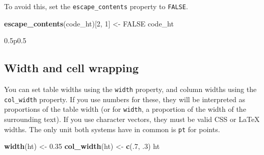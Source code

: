 \documentclass[]{article}
\newenvironment{Shaded}{\begin{snugshade}}{\end{snugshade}}
\newcommand{\DecValTok}[1]{\textcolor[rgb]{0.00,0.00,0.81}{#1}}
\newcommand{\FloatTok}[1]{\textcolor[rgb]{0.00,0.00,0.81}{#1}}
\newcommand{\KeywordTok}[1]{\textcolor[rgb]{0.13,0.29,0.53}{\textbf{#1}}}
\newcommand{\NormalTok}[1]{#1}
\newcommand{\OtherTok}[1]{\textcolor[rgb]{0.56,0.35,0.01}{#1}}
\newcommand{\StringTok}[1]{\textcolor[rgb]{0.31,0.60,0.02}{#1}}
\begin{document}
To avoid this, set the \texttt{escape\_contents} property to
\texttt{FALSE}.

\begin{Shaded}
\begin{Highlighting}[]
\KeywordTok{escape_contents}\NormalTok{(code_ht)[}\DecValTok{2}\NormalTok{, }\DecValTok{1}\NormalTok{] <-}\StringTok{ }\OtherTok{FALSE}
\NormalTok{code_ht}
\end{Highlighting}
\end{Shaded}

\begin{table}[h]
\centering\begin{tabularx}{0.5\textwidth}{p{}}
\tabularnewline[-0.5pt]
\tabularnewline[-0.5pt]
\end{tabularx}

\end{table}
\FloatBarrier

\hypertarget{width-and-cell-wrapping}{%
\subsection{Width and cell wrapping}\label{width-and-cell-wrapping}}

You can set table widths using the \texttt{width} property, and column
widths using the \texttt{col\_width} property. If you use numbers for
these, they will be interpreted as proportions of the table width (or
for \texttt{width}, a proportion of the width of the surrounding text).
If you use character vectors, they must be valid CSS or LaTeX widths.
The only unit both systems have in common is \texttt{pt} for points.

\begin{Shaded}
\begin{Highlighting}[]
\KeywordTok{width}\NormalTok{(ht) <-}\StringTok{ }\FloatTok{0.35}
\KeywordTok{col_width}\NormalTok{(ht) <-}\StringTok{ }\KeywordTok{c}\NormalTok{(.}\DecValTok{7}\NormalTok{, }\FloatTok{.3}\NormalTok{)}
\NormalTok{ht}
\end{Highlighting}
\end{Shaded}
\end{document}
